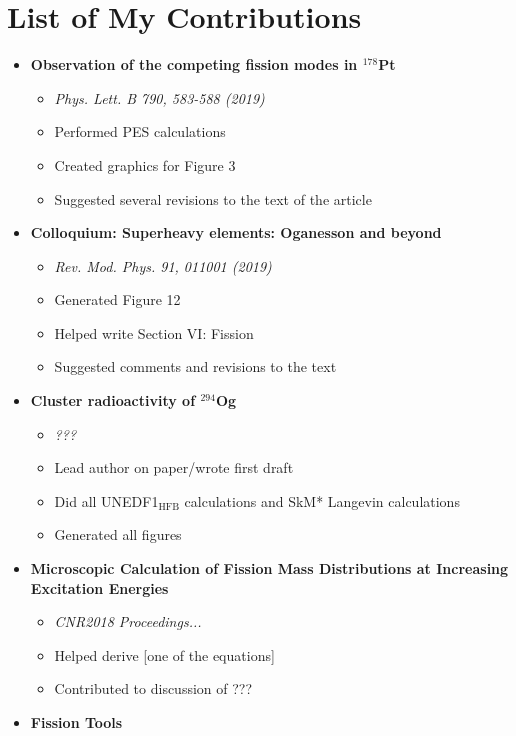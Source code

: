 \chapter{List of My Contributions}\label{append:Contributions}

\begin{itemize}
	\item \textbf{Observation of the competing fission modes in $^{178}$Pt}
	\begin{itemize}
		\item \textit{Phys. Lett. B 790, 583-588 (2019)}
		\item Performed PES calculations
		\item Created graphics for Figure 3
		\item Suggested several revisions to the text of the article
	\end{itemize}
	\item \textbf{Colloquium: Superheavy elements: Oganesson and beyond}
	\begin{itemize}
		\item \textit{Rev. Mod. Phys. 91, 011001 (2019)}
		\item Generated Figure 12
		\item Helped write Section VI: Fission
		\item Suggested comments and revisions to the text
	\end{itemize}
	\item \textbf{Cluster radioactivity of $^{294}$Og}
	\begin{itemize}
		\item \textit{???}
		\item Lead author on paper/wrote first draft
		\item Did all UNEDF1$_{\mathrm{HFB}}$ calculations and SkM* Langevin calculations
		\item Generated all figures
	\end{itemize}
	\item \textbf{Microscopic Calculation of Fission Mass Distributions at Increasing Excitation Energies}
	\begin{itemize}
		\item \textit{CNR2018 Proceedings...}
		\item Helped derive [one of the equations]
		\item Contributed to discussion of ???
	\end{itemize}
	\item \textbf{Fission Tools}
	\begin{itemize}

\end{itemize}
\end{itemize}
